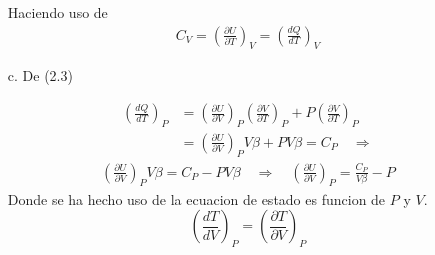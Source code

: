 \documentclass[a4paper]{article}
\begin{document}
\begin{answer}
\begin{itemize}
        Haciendo uso de  
        \begin{align*}
            C_V = \left( \frac{\partial U}{\partial T} \right)_V  = \left(\frac{dQ}{dT}\right)_V 
        \end{align*}
        \item [c.] De (2.3)

        \begin{align*}
            \left(
                \frac {dQ}{dT}
        \right)_P &= \left( \frac{\partial U}{\partial V} \right)_P \left( \frac{\partial V}{\partial T} \right)_P + P \left( \frac{\partial V}{\partial T} \right)_P\\
        &= \left( \frac{\partial U}{\partial V} \right)_P V \beta + P V \beta = C_P \quad \Rightarrow
        \end{align*}
        \begin{align*}
            \left( \frac{\partial U}{\partial V} \right)_P V\beta = C_P - PV\beta \quad \Rightarrow \quad \left( \frac{\partial U}{\partial V} \right)_P = \frac{C_P}{V\beta} - P
        \end{align*}
        Donde se ha hecho uso de la ecuacion de estado es funcion de $P$ y $V$.
        $$ \left(
            \frac {dT}{dV}
        \right)_P = \left( \frac{\partial T}{\partial V} \right)_P$$
        \end{itemize}
    \end{answer}
    
\end{document}
